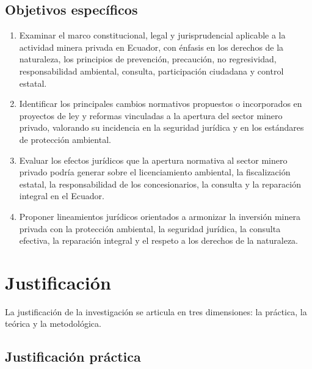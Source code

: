 \subsection{Objetivos específicos}

\begin{enumerate}
    \item Examinar el marco constitucional, legal y jurisprudencial aplicable a la actividad minera privada en Ecuador, con énfasis en los derechos de la naturaleza, los principios de prevención, precaución, no regresividad, responsabilidad ambiental, consulta, participación ciudadana y control estatal.

    \item Identificar los principales cambios normativos propuestos o incorporados en proyectos de ley y reformas vinculadas a la apertura del sector minero privado, valorando su incidencia en la seguridad jurídica y en los estándares de protección ambiental.

    \item Evaluar los efectos jurídicos que la apertura normativa al sector minero privado podría generar sobre el licenciamiento ambiental, la fiscalización estatal, la responsabilidad de los concesionarios, la consulta y la reparación integral en el Ecuador.

    \item Proponer lineamientos jurídicos orientados a armonizar la inversión minera privada con la protección ambiental, la seguridad jurídica, la consulta efectiva, la reparación integral y el respeto a los derechos de la naturaleza.
\end{enumerate}

\section{Justificación}

La justificación de la investigación se articula en tres dimensiones: la práctica, la teórica y la metodológica.

\subsection{Justificación práctica}

